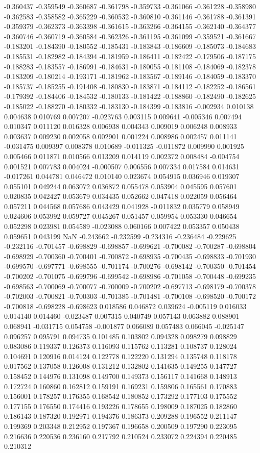 -0.360437
-0.359549
-0.360687
-0.361798
-0.359733
-0.361066
-0.361228
-0.358980
-0.362583
-0.358582
-0.365229
-0.360532
-0.360810
-0.361146
-0.361788
-0.361391
-0.359379
-0.362373
-0.363398
-0.361615
-0.363266
-0.364155
-0.362140
-0.364377
-0.360746
-0.360719
-0.360584
-0.362326
-0.361195
-0.361099
-0.359521
-0.361667
-0.183201
-0.184390
-0.180552
-0.185431
-0.183843
-0.186609
-0.185073
-0.184683
-0.185531
-0.182982
-0.184394
-0.181959
-0.186411
-0.182422
-0.179506
-0.187175
-0.188283
-0.183557
-0.186991
-0.184631
-0.180055
-0.181108
-0.184069
-0.182378
-0.183209
-0.180214
-0.193171
-0.181962
-0.183567
-0.189146
-0.184059
-0.183370
-0.185737
-0.185255
-0.191408
-0.180830
-0.183871
-0.184112
-0.182252
-0.186561
-0.179392
-0.184406
-0.184532
-0.180133
-0.181422
-0.188860
-0.182490
-0.182625
-0.185022
-0.188270
-0.180332
-0.183130
-0.184399
-0.183816
-0.002934
0.010138
0.004638
0.010769
0.007207
-0.023763
0.003115
0.009641
-0.005346
0.007494
0.010347
0.011120
0.016328
0.006938
0.004343
0.009019
0.006248
0.008933
0.003637
0.009230
0.002058
0.002901
0.001224
0.008986
0.002457
0.011141
-0.031475
0.009397
0.008378
0.010689
-0.011325
-0.011872
0.009990
0.001925
0.005466
0.011871
0.010566
0.013209
0.014119
0.002372
0.008484
-0.004754
0.001521
0.007783
0.004024
-0.000507
0.006556
0.007334
0.017584
0.014631
-0.017261
0.044781
0.046472
0.010140
0.023674
0.054915
0.036946
0.019307
0.055101
0.049244
0.063072
0.036872
0.055478
0.053904
0.045595
0.057601
0.020835
0.042427
0.053679
0.034435
0.052662
0.047418
0.022059
0.056464
0.057211
0.044568
0.057686
0.043429
0.041928
-0.011832
0.035779
0.058949
0.024606
0.053992
0.059727
0.045267
0.051457
0.059954
0.053330
0.046654
0.052298
0.023981
0.054589
-0.023088
0.060166
0.007422
0.053357
0.050438
0.059651
0.043199
NaN
-0.243662
-0.232599
-0.234316
-0.236484
-0.229625
-0.232116
-0.701457
-0.698829
-0.698857
-0.699621
-0.700082
-0.700287
-0.698804
-0.698929
-0.700360
-0.700401
-0.700872
-0.698935
-0.700435
-0.698833
-0.701930
-0.699570
-0.697771
-0.698555
-0.701174
-0.700276
-0.698142
-0.700350
-0.701454
-0.700202
-0.701075
-0.699796
-0.699542
-0.698986
-0.701058
-0.700448
-0.699235
-0.698563
-0.700069
-0.700077
-0.700009
-0.700202
-0.697713
-0.698179
-0.700378
-0.702003
-0.700821
-0.700303
-0.701385
-0.701481
-0.700108
-0.698520
-0.700172
-0.700818
-0.698228
-0.698623
0.018586
0.046872
0.039624
-0.005119
0.016033
0.014140
0.014460
-0.023487
0.007315
0.040749
0.057143
0.063882
0.088901
0.068941
-0.031715
0.054758
-0.001877
0.066089
0.057483
0.066045
-0.025147
0.096257
0.095791
0.094735
0.101485
0.103802
0.094328
0.098279
0.098829
0.083086
0.119337
0.126373
0.116093
0.115762
0.113281
0.108737
0.128024
0.104691
0.120916
0.014124
0.122778
0.122220
0.131294
0.135748
0.118178
0.017562
0.137058
0.126008
0.131212
0.132802
0.141635
0.149255
0.147727
0.158452
0.144976
0.131098
0.149700
0.149373
0.156117
0.141668
0.148913
0.172724
0.160860
0.162812
0.159191
0.169231
0.159806
0.165561
0.170883
0.156001
0.178257
0.176355
0.168542
0.180852
0.173292
0.177103
0.175552
0.177155
0.176550
0.174416
0.193226
0.178655
0.198009
0.187025
0.182860
0.186143
0.187320
0.192971
0.194376
0.186373
0.209288
0.196552
0.211147
0.199369
0.203348
0.212952
0.197367
0.196658
0.200509
0.197290
0.223095
0.216636
0.220536
0.236160
0.217792
0.210524
0.233072
0.224394
0.220485
0.210312
